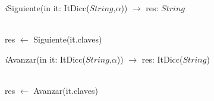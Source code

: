 \begin{Algoritmos}
\textit{i}Siguiente(in it: ItDicc($String$,$\alpha$)) $\longrightarrow$ res: $String$\\
\hspace*{9mm}\\
\begin{algorithm}[H]
\BlankLine
res $\leftarrow$ Siguiente(it.claves)
\end{algorithm}

\textit{i}Avanzar(in it: ItDicc($String$,$\alpha$)) $\longrightarrow$  res: ItDicc($String$)\\
\hspace*{9mm}\\
\begin{algorithm}[H]
\BlankLine
res $\leftarrow$ Avanzar(it.claves)
\end{algorithm}

\end{Algoritmos}
